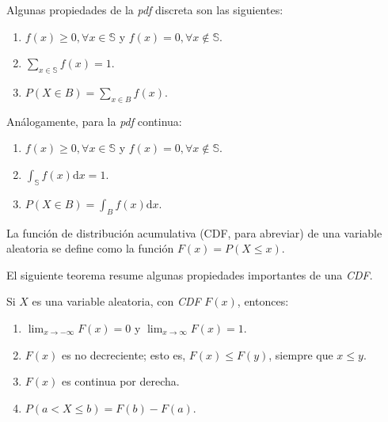 	Algunas propiedades de la \textit{pdf} discreta son las siguientes:
	\begin{enumerate}
		\item $f(x)\geq0, \forall x\in\mathbb{S}$ y $f(x)=0,\forall x\not\in \mathbb{S}$.
		\item $\sum_{x\in\mathbb{S}}f(x)=1$.
		\item $P(X\in B)=\sum_{x\in B} f(x).$
	\end{enumerate}
	Análogamente, para la \textit{pdf} continua:
	\begin{enumerate}
		\item $f(x)\geq0, \forall x\in\mathbb{S}$ y $f(x)=0,\forall x\not\in \mathbb{S}$.
		\item $\int_{\mathbb{S}}f(x)\mathrm{d}x=1$.
		\item $P(X\in B)=\int_{B}f(x)\mathrm{d}x.$
	\end{enumerate}
	\begin{defi}
		La función de distribución acumulativa (CDF, para abreviar) de una variable aleatoria se define como la función $F(x)=P(X\leq x)$.
	\end{defi}
	El siguiente teorema resume algunas propiedades importantes de una \textit{CDF}. 
	
	\begin{theo}
		Si $X$ es una variable aleatoria, con \textit{CDF} $F(x)$, entonces:
		\begin{enumerate}
			\item $\lim_{x\rightarrow-\infty}F(x)=0$ y $\lim_{x\rightarrow\infty} F(x)=1.$
			\item $F(x)$ es no decreciente; esto es, $F(x)\leq F(y)$, siempre que $x\leq y$.
			\item $F(x)$ es continua por derecha.
			\item $P(a< X \leq b)=F(b)-F(a).$
		\end{enumerate}
	\end{theo}
	
